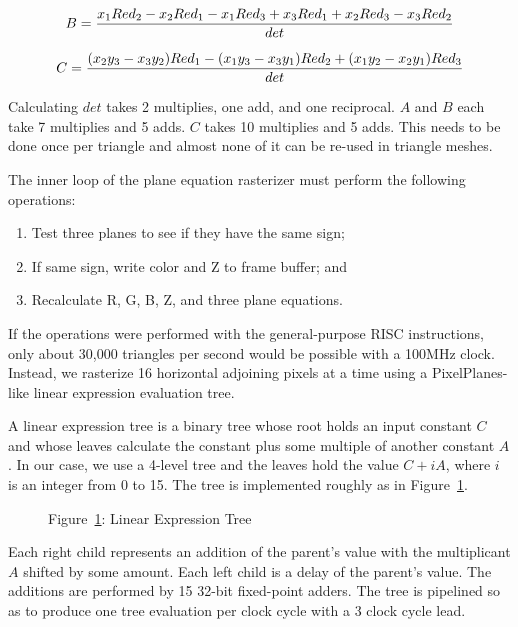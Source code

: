 \documentclass{book}
\begin{document}
$$B = {x_1  Red_2 - x_2  Red_1 - x_1  Red_3 + x_3  Red_1 +
        x_2  Red_3 - x_3  Red_2 \over det}$$

$$C = {(x_2  y_3 - x_3  y_2)  Red_1 - (x_1  y_3 - x_3  y_1)  Red_2 +
        (x_1  y_2 - x_2  y_1)  Red_3 \over det}$$

Calculating $det$ takes 2 multiplies, one add, and one reciprocal. 
$A$ and $B$ each take 7 multiplies and 5 adds.  $C$ takes 10
multiplies and 5 adds.  This needs to be done once per triangle and
almost none of it can be re-used in triangle meshes.


The inner loop of the plane equation rasterizer must perform the following
operations:

\begin{enumerate}
\item Test three planes to see if they have the same sign;
\item If same sign, write color and Z to frame buffer; and
\item Recalculate R, G, B, Z, and three plane equations.
\end{enumerate}

If the operations were performed with the general-purpose RISC
instructions, only about 30,000 triangles per second would be possible
with a 100MHz clock.  Instead, we rasterize 16 horizontal adjoining
pixels at a time using a PixelPlanes-like linear expression evaluation
tree.


A linear expression tree is a binary tree whose root holds an input
constant $C$ and whose leaves calculate the constant plus some
multiple of another constant $A$.  In our case, we use a 4-level tree
and the leaves hold the value $C + iA$, where $i$ is an integer from 0
to 15.  The tree is implemented roughly as in Figure~\ref{fig:lineartree}.

\begin{figure}
\label{fig:lineartree}\centerline{\hspace{-0.75in}Figure~\ref{fig:lineartree}: Linear Expression Tree}
\end{figure}

Each right child represents an addition of the parent's value with the
multiplicant $A$ shifted by some amount.  Each left child is a delay
of the parent's value.  The additions are performed by 15 32-bit
fixed-point adders.  The tree is pipelined so as to produce one tree
evaluation per clock cycle with a 3 clock cycle lead.
\end{document}
